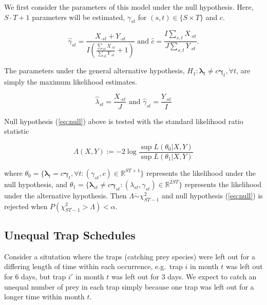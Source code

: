 \documentclass[12pt]{article}\usepackage[]{graphicx}\usepackage[]{color}
\begin{document}
We first consider the parameters of this model under the null hypothesis.  Here, $S\cdot T + 1$ parameters will be estimated, $\gamma_{st}$ for $(s,t) \in \{S \times T\}$ and $c$. 

\begin{equation*}
  \hat{\gamma}_{st} = \frac{X_{\cdot st} + Y_{\cdot st}}{I\left(\frac{\sum_{st} X_{\cdot st}}{\sum_{st}Y_{\cdot st}} +1 \right)} \text{ and } \hat{c} = \frac{I\sum_{s,t} X_{\cdot st}}{J\sum_{s,t} Y_{\cdot st}}.
\end{equation*}

The parameters under the general alternative hypothesis,  $H_1:   \boldsymbol{\lambda}_t \ne c \boldsymbol{\gamma}_t, \forall t$, are simply the maximum likelihood estimates.

\begin{equation*}
  \hat{\lambda}_{st} = \frac{X_{\cdot st}}{J} \text{ and } \hat{\gamma}_{st} = \frac{Y_{\cdot st}}{I}
\end{equation*}

Null hypothesis (\ref{eq:null}) above is tested with the standard likelihood ratio statistic

\begin{equation}
  \label{eq:lrt}
  \Lambda(X,Y) := -2 \log{ \frac{ \sup L(\theta_0|X,Y)}{ \sup L(\theta_1|X,Y)} }
\end{equation}

where $\theta_0 = \{ \boldsymbol{\lambda}_t = c \boldsymbol{\gamma}_t, \forall t : (\gamma_{st}, c) \in \mathbb{R}^{ST+1} \}$ represents the likelihood under the null hypothesis, and $\theta_1 = \{ \boldsymbol{\lambda}_{st} \ne c \boldsymbol{\gamma}_{st} : (\lambda_{st}, \gamma_{st}) \in \mathbb{R}^{2ST} \}$ represents the likelihood under the alternative hypothesis.  Then $\Lambda \dot{\sim} \chi^2_{ST-1}$ and null hypothesis (\ref{eq:null}) is rejected when $P(\chi^2_{ST-1} > \Lambda) < \alpha$. 

\subsection{Unequal Trap Schedules}
Consider a situtation where the traps (catching prey species) were left out for a differing length of time within each occurrence, e.g.\ trap $i$ in month $t$ was left out for $6$ days, but trap $i'$ in month $t$ was left out for $3$ days.  We expect to catch an unequal number of prey in each trap simply because one trap was left out for a longer time within month $t$.  
\end{document}
